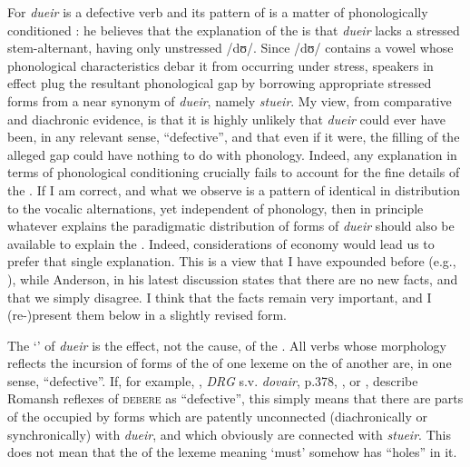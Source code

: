 \documentclass[output=paper,
modfonts
]{LSP/langsci}
\begin{document}
For \citet{anderson2008a,anderson2010a} \emph{dueir} is a defective verb and its
pattern of  is a matter of phonologically conditioned
: he believes that the explanation of the  is that
\emph{dueir} lacks a stressed stem-alternant, having only unstressed
/dʊ/. Since /dʊ/ contains a vowel whose phonological characteristics
debar it from occurring under stress, speakers in effect plug the
resultant phonological gap by borrowing appropriate stressed forms from
a near synonym of \emph{dueir}, namely \emph{stueir}. My view, from
comparative and diachronic evidence, is that it is highly unlikely that
\emph{dueir} could ever have been, in any relevant sense, ``defective'',
and that even if it were, the filling of the alleged gap could have
nothing to do with phonology. Indeed, any explanation in terms of
phonological conditioning crucially fails to account for the fine
details of the . If I am correct, and what we observe is a
pattern of  identical in distribution to the vocalic
alternations, yet independent of phonology, then in principle whatever
explains the paradigmatic distribution of forms of \emph{dueir} should
also be available to explain the . Indeed,
considerations of economy would lead us to prefer that single
explanation. This is a view that I have expounded before (e.g., \citealt[46--49]{maiden2011a}), while Anderson, in his latest discussion \citeyear[8]{anderson2013stem} states
that there are no new facts, and that we simply disagree. I think that
the facts remain very important, and I (re-)present them below in a
slightly revised form.

\largerpage
The `' of \emph{dueir} is the effect, not the cause, of the
. All  verbs whose morphology reflects the incursion
of forms of the  of one lexeme on the  of another are,
in one sense, ``defective''. If, for example, \citet[89f.n5]{grisch1939a},
\emph{DRG} s.v. \emph{dovair}, p.378, \citet[155;158]{decurtins1958a}, or
\citet[165f]{signorell1987a}, describe Romansh reflexes of
\textsc{debere} as ``defective'', this simply means that there are parts
of the  occupied by forms which are patently unconnected
(diachronically or synchronically) with \emph{dueir}, and which
obviously are connected with \emph{stueir}. This does not mean that the
 of the lexeme meaning `must' somehow has ``holes'' in it.
\end{document}
